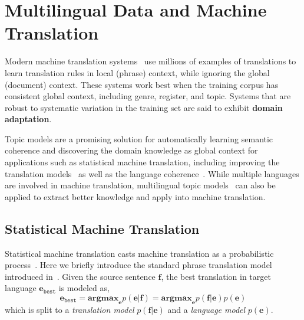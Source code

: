 \chapter{Multilingual Data and Machine Translation}
\label{ch:mt}


Modern machine translation systems~\citep{koehn-09} use millions of examples of translations to learn translation rules in local (phrase) context, while ignoring the global (document) context. These systems work best when the training corpus has consistent global context, including genre, register, and topic. Systems that are robust to systematic variation in the training set are said to exhibit \textbf{domain adaptation}.

Topic models are a promising solution for automatically learning semantic coherence and discovering the domain knowledge as global context for applications such as statistical machine translation, including improving the translation models~\citep{Eidelman-12,hu-14,zhao-06,xiao-12,xiong-13} as well as the language coherence~\citep{Bellegarda-04,wood-09}.
While multiple languages are involved in machine translation, multilingual topic models~\citep{mimno-09,boyd-graber-10} can also be applied to extract better knowledge and apply into machine translation.

\section{Statistical Machine Translation}


Statistical machine translation casts machine translation as a probabilistic process~\citep{koehn-09}. Here we briefly introduce the standard phrase translation model introduced in~\citep{koehn-03}. Given the source sentence $\mathbf{f}$, the best translation in target language $\mathbf{e}_\texttt{best}$ is modeled as,
\begin{equation}
\mathbf{e}_\texttt{best} = \textbf{argmax}_\mathbf{e} p(\mathbf{e}|\mathbf{f}) = \textbf{argmax}_\mathbf{e} p(\mathbf{f}|\mathbf{e}) p (\mathbf{e})
\end{equation}
which is split to a \textit{translation model} $p(\mathbf{f}|\mathbf{e})$ and a \textit{language model} $p (\mathbf{e})$.


